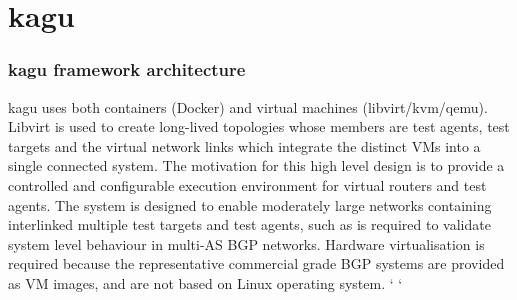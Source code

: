 
 \section{kagu}


\subsubsection*{ kagu framework architecture
}

 kagu uses  both containers (Docker) and virtual machines (libvirt/kvm/qemu).  Libvirt is used to create long-lived topologies whose members are test agents, test targets and the virtual network links which integrate the distinct VMs into a single connected system.  The motivation for this high level design is to provide a controlled and configurable execution environment for virtual routers and test agents.  The system is designed to enable moderately large networks containing interlinked multiple test targets and test agents, such as is required to validate system level behaviour in multi-AS BGP networks.  Hardware virtualisation is required because the representative commercial grade BGP systems are provided as VM images, and are not based on Linux operating system. `
 `
